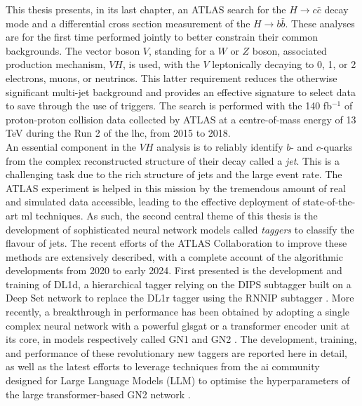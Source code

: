 \newpage
This thesis presents, in its last chapter, an ATLAS search for the $H \rightarrow c\bar{c}$ decay mode and a differential cross section measurement of the $H \rightarrow b\bar{b}$. These analyses are for the first time performed jointly to better constrain their common backgrounds. The vector boson $V$, standing for a $W$ or $Z$ boson, associated production mechanism, $VH$, is used, with the $V$ leptonically decaying to 0, 1, or 2 electrons, muons, or neutrinos. This latter requirement reduces the otherwise significant multi-jet background and provides an effective signature to select data to save through the use of triggers. The search is performed with the 140 fb$^{-1}$ of proton-proton collision data collected by ATLAS at a centre-of-mass energy of 13 TeV during the Run 2 of the \gls{lhc}, from 2015 to 2018. \\

An essential component in the $VH$ analysis is to reliably identify $b$- and $c$-quarks from the complex reconstructed structure of their decay called a \textit{jet}. This is a challenging task due to the rich structure of jets and the large event rate. The ATLAS experiment is helped in this mission by the tremendous amount of real and simulated data accessible, leading to the effective deployment of state-of-the-art \gls{ml} techniques. As such, the second central theme of this thesis is the development of sophisticated neural network models called \textit{taggers} to classify the flavour of jets. The recent efforts of the ATLAS Collaboration to improve these methods are extensively described, with a complete account of the algorithmic developments from 2020 to early 2024. First presented is the development and training of DL1d, a hierarchical tagger relying on the DIPS subtagger built on a Deep Set network to replace the DL1r tagger using the RNNIP subtagger \cite{ATL-PLOT-FTAG-2023-01}. More recently, a breakthrough in performance has been obtained by adopting a single complex neural network with a powerful gls{gat} or a transformer encoder unit at its core, in models respectively called GN1 \cite{ATL-PHYS-PUB-2022-027} and GN2 \cite{duperrin2023flavour}. The development, training, and performance of these revolutionary new taggers are reported here in detail, as well as the latest efforts to leverage techniques from the \gls{ai} community designed for Large Language Models (LLM) to optimise the hyperparameters of the large transformer-based GN2 network \cite{yang2021tuning, publicplotMUP}. \\

